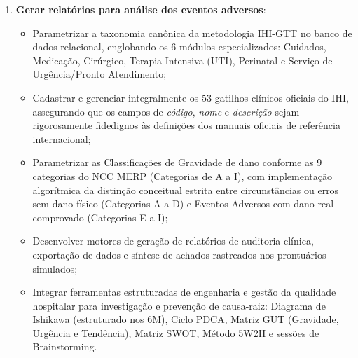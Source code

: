 \begin{enumerate}
    \item \textbf{Gerar relatórios para análise dos eventos adversos}:
    \begin{itemize}
        \item Parametrizar a taxonomia canônica da metodologia IHI-GTT no banco de dados relacional, englobando os 6 módulos especializados: Cuidados, Medicação, Cirúrgico, Terapia Intensiva (UTI), Perinatal e Serviço de Urgência/Pronto Atendimento;
        \item Cadastrar e gerenciar integralmente os 53 gatilhos clínicos oficiais do IHI, assegurando que os campos de \textit{código}, \textit{nome} e \textit{descrição} sejam rigorosamente fidedignos às definições dos manuais oficiais de referência internacional;
        \item Parametrizar as Classificações de Gravidade de dano conforme as 9 categorias do NCC MERP (Categorias de A a I), com implementação algorítmica da distinção conceitual estrita entre circunstâncias ou erros sem dano físico (Categorias A a D) e Eventos Adversos com dano real comprovado (Categorias E a I);
        \item Desenvolver motores de geração de relatórios de auditoria clínica, exportação de dados e síntese de achados rastreados nos prontuários simulados;
        \item Integrar ferramentas estruturadas de engenharia e gestão da qualidade hospitalar para investigação e prevenção de causa-raiz: Diagrama de Ishikawa (estruturado nos 6M), Ciclo PDCA, Matriz GUT (Gravidade, Urgência e Tendência), Matriz SWOT, Método 5W2H e sessões de Brainstorming.
    \end{itemize}


\end{enumerate}
